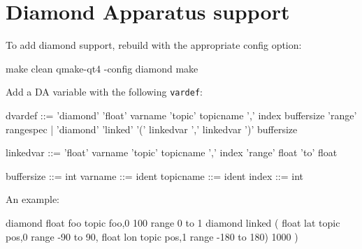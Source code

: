 \section{Diamond Apparatus support}
To add diamond support, rebuild with the appropriate config option:
\begin{v}
make clean
qmake-qt4 -config diamond
make
\end{v}
Add a DA variable with the following \texttt{vardef}:
\begin{v}
dvardef     ::= 'diamond' 'float' varname 'topic' topicname ',' index
                 buffersize 'range' rangespec
            |   'diamond' 'linked' '(' { linkedvar ',' } linkedvar ')'
                buffersize

linkedvar  ::= 'float' varname 'topic' topicname ',' index
               'range' float 'to' float

buffersize  ::= int
varname     ::= ident
topicname   ::= ident
index       ::= int
\end{v}
An example:
\begin{v}
diamond float foo topic foo,0   100 range 0 to 1
diamond linked (
    float lat topic pos,0   range -90 to 90,
    float lon topic pos,1   range -180 to 180) 1000
)    
\end{v}


